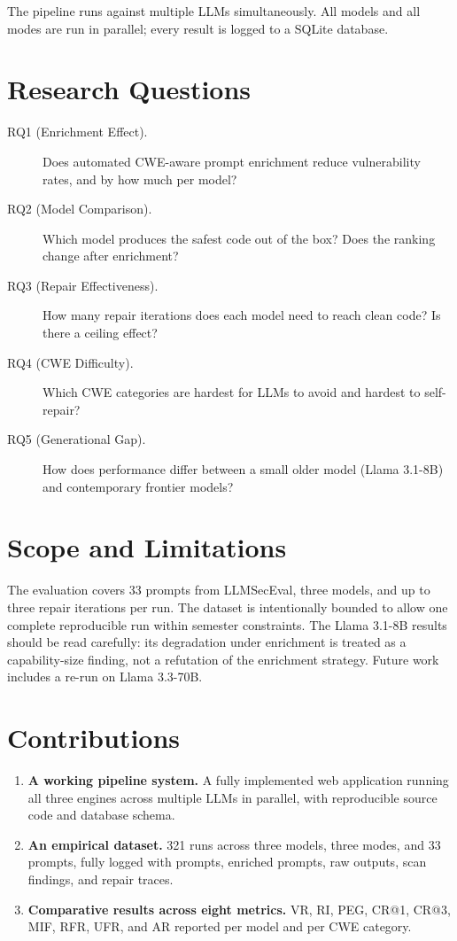 \documentclass[12pt,a4paper]{report}
\begin{document}
The pipeline runs against multiple LLMs simultaneously. All models and all modes
are run in parallel; every result is logged to a SQLite database.

\section{Research Questions}
\label{sec:rqs}

\begin{description}
  \item[RQ1 (Enrichment Effect).] Does automated CWE-aware prompt enrichment
        reduce vulnerability rates, and by how much per model?
  \item[RQ2 (Model Comparison).] Which model produces the safest code out of the
        box? Does the ranking change after enrichment?
  \item[RQ3 (Repair Effectiveness).] How many repair iterations does each model
        need to reach clean code? Is there a ceiling effect?
  \item[RQ4 (CWE Difficulty).] Which CWE categories are hardest for LLMs to avoid
        and hardest to self-repair?
  \item[RQ5 (Generational Gap).] How does performance differ between a small older
        model (Llama 3.1-8B) and contemporary frontier models?
\end{description}

\section{Scope and Limitations}
\label{sec:scope}

The evaluation covers 33 prompts from LLMSecEval, three models, and up to three
repair iterations per run. The dataset is intentionally bounded to allow one
complete reproducible run within semester constraints. The Llama 3.1-8B results
should be read carefully: its degradation under enrichment is treated as a
capability-size finding, not a refutation of the enrichment strategy. Future work
includes a re-run on Llama 3.3-70B.

\section{Contributions}
\label{sec:contributions}

\begin{enumerate}
  \item \textbf{A working pipeline system.} A fully implemented web application
        running all three engines across multiple LLMs in parallel, with
        reproducible source code and database schema.
  \item \textbf{An empirical dataset.} 321 runs across three models, three modes,
        and 33 prompts, fully logged with prompts, enriched prompts, raw outputs,
        scan findings, and repair traces.
  \item \textbf{Comparative results across eight metrics.} VR, RI, PEG, CR@1,
        CR@3, MIF, RFR, UFR, and AR reported per model and per CWE category.
\end{enumerate}
\end{document}
